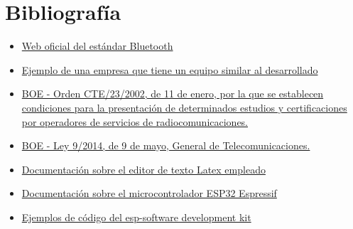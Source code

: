 \documentclass[a4paper ,12pt, onecolumn]{article}
\begin{document}
\section{Bibliografía}
    \begin{itemize}
        \item \href{https://www.bluetooth.com/}{Web oficial del estándar Bluetooth}
        \item \href{https://accent-systems.com/es/producto/ibks-105/}{Ejemplo de una empresa que tiene un equipo
        similar al desarrollado}
        \item \href{https://www.boe.es/diario_boe/txt.php?id=BOE-A-2002-694}{BOE - Orden CTE/23/2002, de 11 de enero, por la que se establecen condiciones para la presentación de determinados estudios y certificaciones por operadores de servicios de radiocomunicaciones.}
        \item \href{https://www.boe.es/buscar/act.php?id=BOE-A-2014-4950}{BOE - Ley 9/2014, de 9 de mayo, General de Telecomunicaciones.}
        \item \href{http://www.sharelatex.com}{Documentación sobre el editor de texto Latex empleado} 
        \item \href{https://docs.espressif.com/projects/esp-idf/en/stable/}{Documentación sobre el microcontrolador ESP32 Espressif}
        \item \href{https://github.com/espressif/esp-idf}{Ejemplos de código del esp-software development kit}
    \end{itemize}
\end{document}
